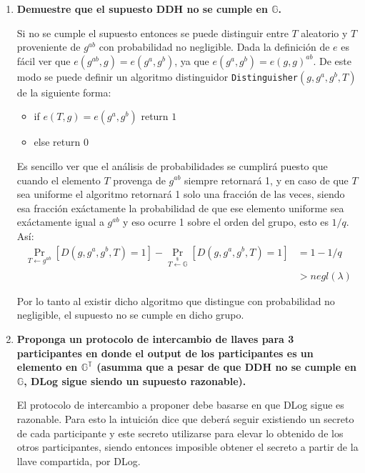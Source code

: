 \documentclass[twoside]{tareas}
\newcommand{\getunif}{\stackrel{\$}{\gets}}
\begin{document}
\begin{enumerate}
    \item \textbf{Demuestre que el supuesto DDH no se cumple en {\boldmath$\mathbb{G}$}.}

    Si no se cumple el supuesto entonces se puede distinguir entre $T$ aleatorio y $T$ proveniente de $g^{ab}$ con probabilidad no negligible. Dada la definición de $e$ es fácil ver que $e(g^{ab}, g) = e(g^a, g^b)$, ya que $e(g^a, g^b) = e(g, g)^{ab}$. De este modo se puede definir un algoritmo distinguidor \texttt{Distinguisher}$(g, g^a, g^b, T)$ de la siguiente forma:

    \begin{itemize}
        \item if $e(T, g) = e(g^a, g^b)$ return $1$
        \item else return $0$
    \end{itemize}

    Es sencillo ver que el análisis de probabilidades se cumplirá puesto que cuando el elemento $T$ provenga de $g^{ab}$ siempre retornará 1, y en caso de que $T$ sea uniforme el algoritmo retornará 1 solo una fracción de las veces, siendo esa fracción exáctamente la probabilidad de que ese elemento uniforme sea exáctamente igual a $g^{ab}$ y eso ocurre 1 sobre el orden del grupo, esto es $1/q$. Así:
    \begin{align*}
        \Pr_{T\leftarrow g^{ab}}[D(g, g^a, g^b, T) = 1] - \Pr_{T\getunif \mathbb{G}}[D(g, g^a, g^b, T) = 1] &= 1 - 1/q\\
        &> negl(\lambda)
    \end{align*}

    Por lo tanto al existir dicho algoritmo que distingue con probabilidad no negligible, el supuesto no se cumple en dicho grupo.

    \item \textbf{Proponga un protocolo de intercambio de llaves para 3 participantes en donde el output de los participantes es un elemento en {\boldmath$\mathbb{G^T}$} (asumma que a pesar de que DDH no se cumple en {\boldmath$\mathbb{G}$}, DLog sigue siendo un supuesto razonable).}

    El protocolo de intercambio a proponer debe basarse en que DLog sigue es razonable. Para esto la intuición dice que deberá seguir existiendo un secreto de cada participante y este secreto utilizarse para elevar lo obtenido de los otros participantes, siendo entonces imposible obtener el secreto a partir de la llave compartida, por DLog.


\end{enumerate}
\end{document}
